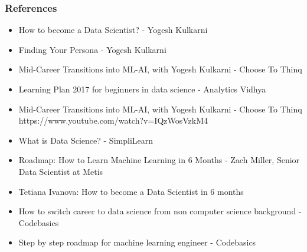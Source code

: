\begin{frame}[fragile]\frametitle{References}
\begin{itemize}
\item How to become a Data Scientist? - Yogesh Kulkarni 
\item Finding Your Persona - Yogesh Kulkarni 
\item Mid-Career Transitions into ML-AI, with Yogesh Kulkarni - Choose To Thinq
\item Learning Plan 2017 for beginners in data science - Analytics Vidhya
\item Mid-Career Transitions into ML-AI, with Yogesh Kulkarni - Choose To Thinq https://www.youtube.com/watch?v=IQzWosVzkM4
\item What is Data Science? - SimpliLearn
\item Roadmap: How to Learn Machine Learning in 6 Months -  Zach Miller, Senior Data Scientist at Metis
\item Tetiana Ivanova: How to become a Data Scientist in 6 months
\item How to switch career to data science from non computer science background - Codebasics
\item Step by step roadmap for machine learning engineer - Codebasics
\end{itemize}
\end{frame}

